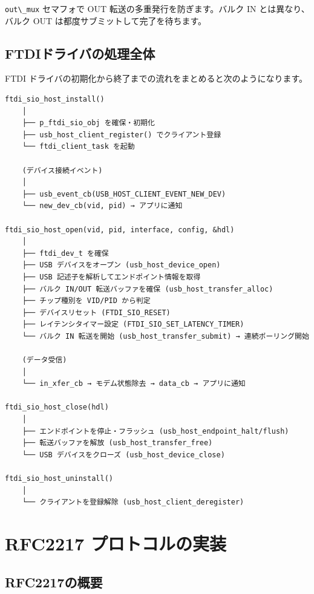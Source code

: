 \documentclass[10pt,twoside,openany,a4j]{ltjsbook}
\newcommand{\passthrough}[1]{#1}
\begin{document}
\passthrough{\lstinline!out\_mux!} セマフォで OUT
転送の多重発行を防ぎます。バルク IN とは異なり、バルク OUT
は都度サブミットして完了を待ちます。

\section{FTDIドライバの処理全体}\label{ftdiux30c9ux30e9ux30a4ux30d0ux306eux51e6ux7406ux5168ux4f53}

FTDI ドライバの初期化から終了までの流れをまとめると次のようになります。

\begin{lstlisting}
ftdi_sio_host_install()
    │
    ├── p_ftdi_sio_obj を確保・初期化
    ├── usb_host_client_register() でクライアント登録
    └── ftdi_client_task を起動

    (デバイス接続イベント)
    │
    ├── usb_event_cb(USB_HOST_CLIENT_EVENT_NEW_DEV)
    └── new_dev_cb(vid, pid) → アプリに通知

ftdi_sio_host_open(vid, pid, interface, config, &hdl)
    │
    ├── ftdi_dev_t を確保
    ├── USB デバイスをオープン (usb_host_device_open)
    ├── USB 記述子を解析してエンドポイント情報を取得
    ├── バルク IN/OUT 転送バッファを確保 (usb_host_transfer_alloc)
    ├── チップ種別を VID/PID から判定
    ├── デバイスリセット (FTDI_SIO_RESET)
    ├── レイテンシタイマー設定 (FTDI_SIO_SET_LATENCY_TIMER)
    └── バルク IN 転送を開始 (usb_host_transfer_submit) → 連続ポーリング開始

    (データ受信)
    │
    └── in_xfer_cb → モデム状態除去 → data_cb → アプリに通知

ftdi_sio_host_close(hdl)
    │
    ├── エンドポイントを停止・フラッシュ (usb_host_endpoint_halt/flush)
    ├── 転送バッファを解放 (usb_host_transfer_free)
    └── USB デバイスをクローズ (usb_host_device_close)

ftdi_sio_host_uninstall()
    │
    └── クライアントを登録解除 (usb_host_client_deregister)
\end{lstlisting}

\chapter{RFC2217
プロトコルの実装}\label{rfc2217-ux30d7ux30edux30c8ux30b3ux30ebux306eux5b9fux88c5}

\section{RFC2217の概要}\label{rfc2217ux306eux6982ux8981}
\end{document}
